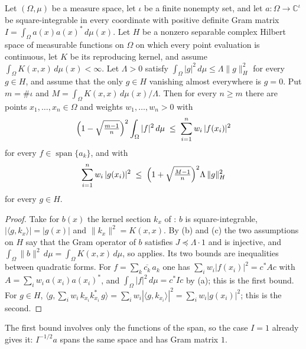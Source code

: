 \begin{corollary}
\label{cor:l2-discretization}
\leanok
Let $(\Omega, \mu)$ be a measure space, let $\iota$ be a finite nonempty set, and let
$a : \Omega \to \mathbb{C}^{\iota}$ be square-integrable in every coordinate with positive
definite Gram matrix $I = \int_\Omega a(x) a(x)^* \, d\mu(x)$. Let $H$ be a nonzero separable
complex Hilbert space of measurable functions on $\Omega$ on which every point evaluation is
continuous, let $K$ be its reproducing kernel, and assume
$\int_\Omega K(x, x) \, d\mu(x) < \infty$. Let
$\Lambda > 0$ satisfy $\int_\Omega |g|^2 \, d\mu \leq \Lambda \|g\|_H^2$ for every
$g \in H$, and assume that the only $g \in H$ vanishing almost everywhere is $g = 0$. Put
$m = \#\iota$ and $M = \int_\Omega K(x, x) \, d\mu(x) / \Lambda$. Then for every $n \geq m$
there are points $x_1, \dots, x_n \in \Omega$ and weights $w_1, \dots, w_n > 0$ with
\[
  \Bigl(1 - \sqrt{\tfrac{m-1}{n}}\Bigr)^2 \int_\Omega |f|^2 \, d\mu
  \; \leq \; \sum_{i=1}^n w_i \, |f(x_i)|^2
\]
for every $f \in \operatorname{span}\{a_k\}$, and with
\[
  \sum_{i=1}^n w_i \, |g(x_i)|^2
  \; \leq \; \Bigl(1 + \sqrt{\tfrac{M-1}{n}}\Bigr)^2 \Lambda \, \|g\|_H^2
\]
for every $g \in H$.
\end{corollary}

\begin{proof}
\leanok
{}
Take for $b(x)$ the kernel section $k_x$ of : $b$ is
square-integrable, $|\langle g, k_x \rangle| = |g(x)|$ and $\|k_x\|^2 = K(x, x)$. By
(b) and (c) the two assumptions on $H$ say that the Gram operator
of $b$ satisfies $J \preceq \Lambda \cdot 1$ and is injective, and
$\int_\Omega \|b\|^2 \, d\mu = \int_\Omega K(x, x) \, d\mu$, so 
applies. Its two bounds are inequalities between quadratic forms. For
$f = \sum_k \overline{c_k} \, a_k$ one has $\sum_i w_i |f(x_i)|^2 = c^* A c$ with
$A = \sum_i w_i \, a(x_i) a(x_i)^*$, and $\int_\Omega |f|^2 \, d\mu = c^* I c$ by
(a); this is the first bound. For $g \in H$,
$\langle g, \sum_i w_i \, k_{x_i} k_{x_i}^* \, g \rangle
= \sum_i w_i |\langle g, k_{x_i} \rangle|^2 = \sum_i w_i |g(x_i)|^2$; this is the second.
\end{proof}

The first bound involves only the functions of the span, so the case $I = 1$ already gives
it: $I^{-1/2} a$ spans the same space and has Gram matrix $1$.

